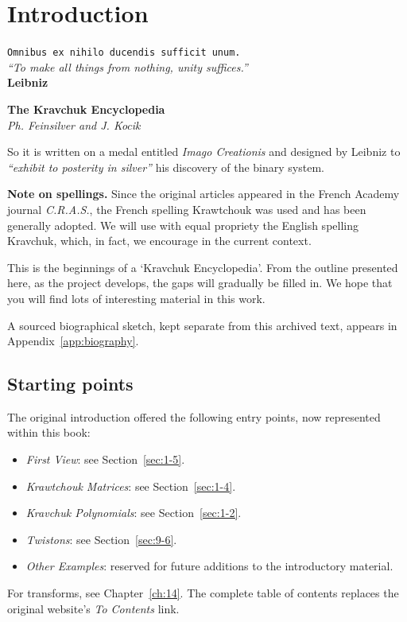 \chapter*{Introduction}
\label{ch:introduction}
\begin{flushright}
\texttt{Omnibus ex nihilo ducendis sufficit unum.}\\
\emph{``To make all things from nothing, unity suffices.''}\\
\textbf{Leibniz}
\end{flushright}
\begin{center}
\textbf{The Kravchuk Encyclopedia}\\
\emph{Ph. Feinsilver and J. Kocik}
\end{center}
So it is written on a medal entitled \emph{Imago Creationis} and designed by Leibniz to \emph{``exhibit to posterity in silver''} his discovery of the binary system.

\medskip
\noindent\textbf{Note on spellings.}
Since the original articles appeared in the French Academy journal \emph{C.R.A.S.}, the French spelling Krawtchouk was used and has been generally adopted. We will use with equal propriety the English spelling Kravchuk, which, in fact, we encourage in the current context.

\medskip
This is the beginnings of a `Kravchuk Encyclopedia'. From the outline presented here, as the project develops, the gaps will gradually be filled in. We hope that you will find lots of interesting material in this work.

\noindent A sourced biographical sketch, kept separate from this archived text, appears in Appendix~\ref{app:biography}.

\section*{Starting points}
The original introduction offered the following entry points, now represented within this book:
\begin{itemize}
\item \emph{First View}: see Section~\ref{sec:1-5}.
\item \emph{Krawtchouk Matrices}: see Section~\ref{sec:1-4}.
\item \emph{Kravchuk Polynomials}: see Section~\ref{sec:1-2}.
\item \emph{Twistons}: see Section~\ref{sec:9-6}.
\item \emph{Other Examples}: reserved for future additions to the introductory material.
\end{itemize}
For transforms, see Chapter~\ref{ch:14}. The complete table of contents replaces the original website's \emph{To Contents} link.


